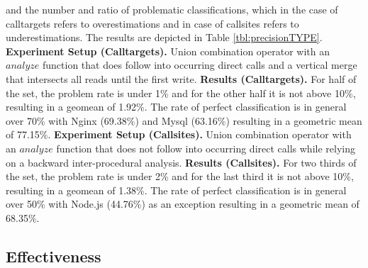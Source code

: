 and the number and ratio of problematic classifications, which in the case of calltargets refers to overestimations and in case of callsites refers to underestimations. The results are depicted 
in Table \ref{tbl:precisionTYPE}.
\textbf{Experiment Setup (Calltargets).} Union combination operator with an $analyze$ function that does follow into occurring direct calls and a vertical merge that intersects all reads until 
the first write.
\textbf{Results (Calltargets).} For half of the set, the problem rate is under 1\% and for the other half it is not above 10\%, resulting in a geomean of 1.92\%. The rate of perfect classification
is in general over 70\% with Nginx (69.38\%) and Mysql (63.16\%) resulting in a geometric mean of 77.15\%.
\textbf{Experiment Setup (Callsites).} Union combination operator with an $analyze$ function that does not follow into occurring direct calls while relying on a backward inter-procedural analysis.
\textbf{Results (Callsites).} For two thirds of the set, the problem rate is under 2\% and for the last third it is not above 10\%, resulting in a geomean of 1.38\%. The rate of perfect 
classification is in general over 50\% with Node.js (44.76\%) as an exception resulting in a geometric mean of 68.35\%.


%
%
%
%
\subsection{Effectiveness}
\label{section:typeshieldeffectiveness}

